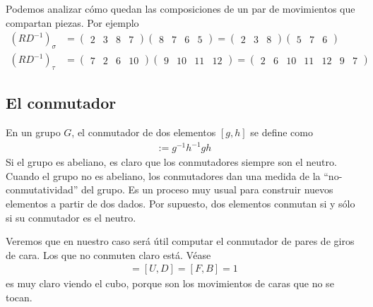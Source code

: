 \documentclass{article}
\theoremstyle{definition}
\newcommand{\comillas}[1]{``#1''}
\begin{document}
Podemos analizar cómo quedan las composiciones de un par de movimientos que compartan piezas. Por ejemplo
\begin{align*}
    (RD^{-1})_\sigma & =\begin{pmatrix}
                            2 & 3 & 8 & 7
                        \end{pmatrix}\begin{pmatrix}
                                         8 & 7 & 6 & 5
                                     \end{pmatrix}=\begin{pmatrix}
                                                       2 & 3 & 8
                                                   \end{pmatrix}
    \begin{pmatrix}
        5 & 7 & 6
    \end{pmatrix}                                                              \\
    (RD^{-1})_\tau   & =\begin{pmatrix}
                            7 & 2 & 6 & 10
                        \end{pmatrix}\begin{pmatrix}
                                         9 & 10 & 11 & 12
                                     \end{pmatrix}=\begin{pmatrix}
                                                       2 & 6 & 10 & 11 & 12 & 9 & 7
                                                   \end{pmatrix}
\end{align*}
\subsection{El conmutador}
En un grupo $G$, el conmutador de dos elementos $[g,h]$ se define como
\begin{align*}
    [g,h]:=g^{-1}h^{-1}gh
\end{align*}
Si el grupo es abeliano, es claro que los conmutadores siempre son el neutro. Cuando el grupo no es abeliano, los conmutadores dan una medida de la \comillas{no-conmutatividad} del grupo. Es un proceso muy usual para construir nuevos elementos a partir de dos dados. Por supuesto, dos elementos conmutan si y sólo si su conmutador es el neutro.

Veremos que en nuestro caso será útil computar el conmutador de pares de giros de cara. Los que no conmuten claro está. Véase
\begin{align*}
    [L,R]=[U,D]=[F,B]=1
\end{align*}
es muy claro viendo el cubo, porque son los movimientos de caras que no se tocan.
\end{document}
